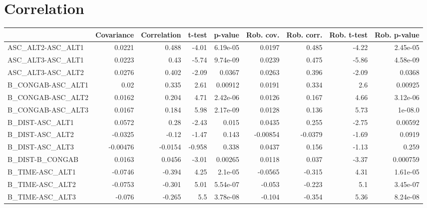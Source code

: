 \section{Correlation}
\begin{tabular}{lrrrrrrrr}
\toprule
{} &  Covariance &  Correlation &  t-test &  p-value &  Rob. cov. &  Rob. corr. &  Rob. t-test &  Rob. p-value \\
\midrule
ASC\_ALT2-ASC\_ALT1   &      0.0221 &        0.488 &   -4.01 & 6.19e-05 &     0.0197 &       0.485 &        -4.22 &      2.45e-05 \\
ASC\_ALT3-ASC\_ALT1   &      0.0223 &         0.43 &   -5.74 & 9.74e-09 &     0.0239 &       0.475 &        -5.86 &      4.58e-09 \\
ASC\_ALT3-ASC\_ALT2   &      0.0276 &        0.402 &   -2.09 &   0.0367 &     0.0263 &       0.396 &        -2.09 &        0.0368 \\
B\_CONGAB-ASC\_ALT1   &        0.02 &        0.335 &    2.61 &  0.00912 &     0.0191 &       0.334 &          2.6 &       0.00925 \\
B\_CONGAB-ASC\_ALT2   &      0.0162 &        0.204 &    4.71 & 2.42e-06 &     0.0126 &       0.167 &         4.66 &      3.12e-06 \\
B\_CONGAB-ASC\_ALT3   &      0.0167 &        0.184 &    5.98 & 2.17e-09 &     0.0128 &       0.136 &         5.73 &       1e-08.0 \\
B\_DIST-ASC\_ALT1     &      0.0572 &         0.28 &   -2.43 &    0.015 &     0.0435 &       0.255 &        -2.75 &       0.00592 \\
B\_DIST-ASC\_ALT2     &     -0.0325 &        -0.12 &   -1.47 &    0.143 &   -0.00854 &     -0.0379 &        -1.69 &        0.0919 \\
B\_DIST-ASC\_ALT3     &    -0.00476 &      -0.0154 &  -0.958 &    0.338 &     0.0437 &       0.156 &        -1.13 &         0.259 \\
B\_DIST-B\_CONGAB     &      0.0163 &       0.0456 &   -3.01 &  0.00265 &     0.0118 &       0.037 &        -3.37 &      0.000759 \\
B\_TIME-ASC\_ALT1     &     -0.0746 &       -0.394 &    4.25 &  2.1e-05 &    -0.0565 &      -0.315 &         4.31 &      1.61e-05 \\
B\_TIME-ASC\_ALT2     &     -0.0753 &       -0.301 &    5.01 & 5.54e-07 &     -0.053 &      -0.223 &          5.1 &      3.45e-07 \\
B\_TIME-ASC\_ALT3     &      -0.076 &       -0.265 &     5.5 & 3.78e-08 &     -0.104 &      -0.354 &         5.36 &      8.24e-08 \\

\end{tabular}
